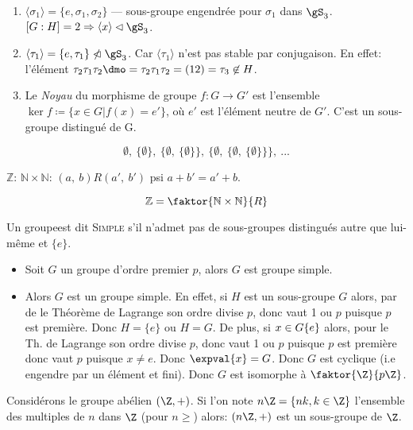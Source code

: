 \begin{examplebox}
	\begin{enumerate}
		\item $\langle \sigma_1 \rangle=\{e,\sigma_1,\sigma_2\}$ --- sous-groupe engendrée pour $\sigma_1$ dans $\gS_3$. $[G:H]=2\Rightarrow \langle x\rangle\lhd\gS_3$.
		\item $\langle \tau_1\rangle=\{e,\tau_1\}\ntriangleleft\gS_3$. Car $\langle \tau_1 \rangle$ n'est pas stable par conjugaison. En effet: l'élément $\tau_2\tau_1\tau_2\dmo =\tau_2\tau_1\tau_2=(12)=\tau_3\not\in H$.
		\item Le \emph{Noyau} du morphisme de groupe $f:G\rightarrow G'$ est l'ensemble $\ker f\coloneq\{x\in G | f(x)=e'\}$, où $e'$ est l'élément neutre de $G'$. C'est un sous-groupe distingué de G.
	\end{enumerate}
\end{examplebox}

\ifcomment
$$\emptyset,\ \{\emptyset\},\ \{\emptyset,\ \{\emptyset\}\},\ \{\emptyset,\ \{\emptyset,\ \{\emptyset\}\}\},\ ...$$

$\mathbb{Z}$: $\mathbb{N}\times\mathbb{N}$:
$(a,\ b)R(a',\ b')$ psi $a+b'=a' + b$.

$$\mathbb{Z}=\faktor{\mathbb{N}\times\mathbb{N}}{R}$$
\fi


\begin{definition}
	Un groupeest dit \textsc{Simple} s'il n'admet pas de sous-groupes distingués autre que lui-même et $\{e\}$.
\end{definition}

\begin{examplebox}
	\begin{itemize}
		\item Soit $G$ un groupe d'ordre premier $p$, alors $G$ est groupe simple.
		\item Alors $G$ est un groupe simple. En effet, si $H$ est un sous-groupe $G$ alors, par de le Théorème de Lagrange son ordre divise $p$, donc vaut 1 ou $p$ puisque $p$ est première. Donc $H=\{e\}$ ou $H=G$. De plus, si $x\in G\\ \{e\}$ alors, pour le Th. de Lagrange son ordre divise $p$, donc vaut 1 ou $p$ puisque $p$ est première donc vaut $p$ puisque $x\neq e$. Donc $\expval{x}=G$. Donc $G$ est cyclique (i.e engendre par un élément et fini). Donc $G$ est isomorphe à $\faktor{\Z}{p\Z}$.
	\end{itemize}
\end{examplebox}

Considérons le groupe abélien $(\Z, +)$. Si l'on note $n\Z=\{nk, k\in\Z\}$ l'ensemble des multiples de $n$ dans $\Z$ (pour $n\geq$) alors: $(n\Z,+)$ est un sous-groupe de $\Z$.

